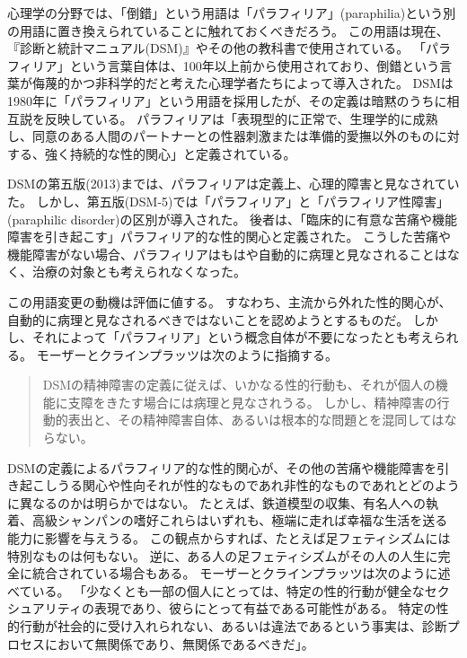 \documentclass[paper=a4,book,openany]{jlreq} \usepackage{mystyle}
\begin{document}
心理学の分野では、「倒錯」という用語は「パラフィリア」(paraphilia)という別の用語に置き換えられていることに触れておくべきだろう。
この用語は現在、『診断と統計マニュアル(DSM)』やその他の教科書で使用されている。
「パラフィリア」という言葉自体は、100年以上前から使用されており、倒錯という言葉が侮蔑的かつ非科学的だと考えた心理学者たちによって導入された。
DSMは1980年に「パラフィリア」という用語を採用したが、その定義は暗黙のうちに相互説を反映している。
パラフィリアは「表現型的に正常で、生理学的に成熟し、同意のある人間のパートナーとの性器刺激または準備的愛撫以外のものに対する、強く持続的な性的関心」と定義されている\citep[p. 685]{APA13:DSM}。

DSMの第五版(2013)までは、パラフィリアは定義上、心理的障害と見なされていた。
しかし、第五版(DSM-5)では「パラフィリア」と「パラフィリア性障害」(paraphilic disorder)の区別が導入された。
後者は、「臨床的に有意な苦痛や機能障害を引き起こす」パラフィリア的な性的関心と定義された\citep[p. 694]{APA13:DSM}。
こうした苦痛や機能障害がない場合、パラフィリアはもはや自動的に病理と見なされることはなく、治療の対象とも考えられなくなった。

この用語変更の動機は評価に値する。
すなわち、主流から外れた性的関心が、自動的に病理と見なされるべきではないことを認めようとするものだ。
しかし、それによって「パラフィリア」という概念自体が不要になったとも考えられる。
モーザーとクラインプラッツは次のように指摘する。

\begin{quote}
  DSMの精神障害の定義に従えば、いかなる性的行動も、それが個人の機能に支障をきたす場合には病理と見なされうる。
しかし、精神障害の行動的表出と、その精神障害自体、あるいは根本的な問題とを混同してはならない。
\citep[p. 103]{moser05:_dsm_iv_tr_parap}

\end{quote}

DSMの定義によるパラフィリア的な性的関心が、その他の苦痛や機能障害を引き起こしうる関心や性向{\DDASH}それが性的なものであれ非性的なものであれ{\DDASH}とどのように異なるのかは明らかではない。
たとえば、鉄道模型の収集、有名人への執着、高級シャンパンの嗜好{\DDASH}これらはいずれも、極端に走れば幸福な生活を送る能力に影響を与えうる。
この観点からすれば、たとえば足フェティシズムには特別なものは何もない。
逆に、ある人の足フェティシズムがその人の人生に完全に統合されている場合もある。
モーザーとクラインプラッツは次のように述べている。
「少なくとも一部の個人にとっては、特定の性的行動が健全なセクシュアリティの表現であり、彼らにとって有益である可能性がある。
特定の性的行動が社会的に受け入れられない、あるいは違法であるという事実は、診断プロセスにおいて無関係であり、無関係であるべきだ」\citep[p.95]{moser05:_dsm_iv_tr_parap}。
\end{document}
